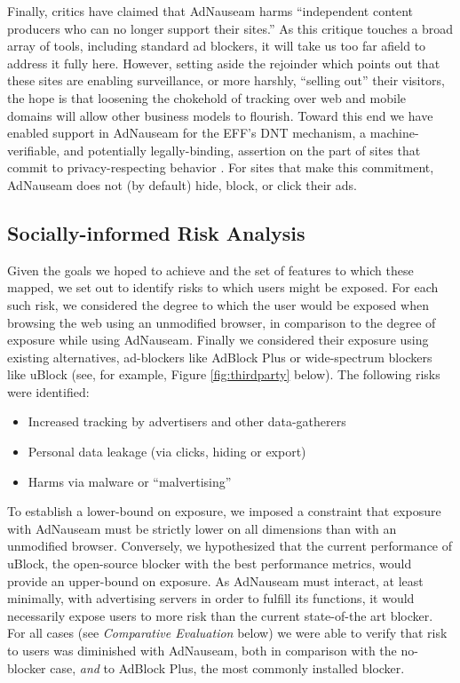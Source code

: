 \documentclass[conference]{IEEEtran}
\begin{document}
\indent Finally, critics have claimed that AdNauseam harms “independent content producers who can no longer support their sites.” As this critique touches a broad array of tools, including standard ad blockers, it will take us too far afield to address it fully here. However, setting aside the rejoinder which points out that these sites are enabling surveillance, or more harshly, “selling out” their visitors, the hope is that loosening the chokehold of tracking over web and mobile domains will allow other business models to flourish. Toward this end we have enabled support in AdNauseam for the EFF's DNT mechanism, a machine-verifiable, and potentially legally-binding, assertion on the part of sites that commit to privacy-respecting behavior \cite{EFF-1}. For sites that make this commitment, AdNauseam does not (by default) hide, block, or click their ads.

\subsection{Socially-informed Risk Analysis}

Given the goals we hoped to achieve and the set of features to which these mapped, we set out to identify risks to which users might be exposed. For each such risk, we considered the degree to which the user would be exposed when browsing the web using an unmodified browser, in comparison to the degree of exposure while using AdNauseam. Finally we considered their exposure using existing alternatives, ad-blockers like AdBlock Plus \cite{AdBlock} or wide-spectrum blockers like uBlock \cite{Gorhill}(see, for example, Figure \ref{fig:thirdparty} below). The following risks were identified:

\begin{itemize}
\item Increased tracking by advertisers and other data-gatherers
\item Personal data leakage (via clicks, hiding or export)
\item Harms via malware or “malvertising”
\end{itemize}

\noindent To establish a lower-bound on exposure, we imposed a constraint that exposure with AdNauseam must be strictly lower on all dimensions than with an unmodified browser. Conversely, we hypothesized that the current performance of uBlock, the open-source blocker with the best performance metrics, would provide an upper-bound on exposure. As AdNauseam must interact, at least minimally, with advertising servers in order to fulfill its functions, it would necessarily expose users to more risk than the current state-of-the art blocker. For all cases (see \emph{Comparative Evaluation} below) we were able to verify that risk to users was diminished with AdNauseam, both in comparison with the no-blocker case, \emph{and} to AdBlock Plus, the most commonly installed blocker\cite{PageFair}.
\end{document}
